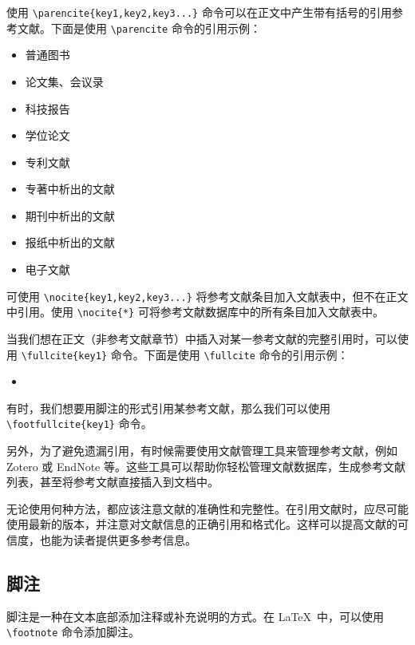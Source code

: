 使用 \verb|\parencite{key1,key2,key3...}| 命令可以在正文中产生带有括号的引用参考文献。下面是使用 \verb|\parencite| 命令的引用示例：

\begin{itemize}
    \item 普通图书\parencite{book1,book2}
    \item 论文集、会议录\parencite{conf1,conf2}
    \item 科技报告\parencite{techreport1,techreport2}
    \item 学位论文\parencite{thesis1,thesis2,thesis3}
    \item 专利文献\parencite{patent1,patent2}
    \item 专著中析出的文献\parencite{inbook1,inbook2}
    \item 期刊中析出的文献\parencite{qin2021,article1,article2}
    \item 报纸中析出的文献\parencite{newspaper1,newspaper2}
    \item 电子文献\parencite{online1,online2,online3}
\end{itemize}

可使用 \verb|\nocite{key1,key2,key3...}| 将参考文献条目加入文献表中，但不在正文中引用。使用 \verb|\nocite{*}| 可将参考文献数据库中的所有条目加入文献表中。

当我们想在正文（非参考文献章节）中插入对某一参考文献的完整引用时，可以使用 \verb|\fullcite{key1}| 命令。下面是使用 \verb|\fullcite| 命令的引用示例：

\begin{itemize}
    \item {}
\end{itemize}

有时，我们想要用脚注的形式引用某参考文献，那么我们可以使用 \verb|\footfullcite{key1}| 命令。

另外，为了避免遗漏引用，有时候需要使用文献管理工具来管理参考文献，例如 Zotero 或 EndNote 等。这些工具可以帮助你轻松管理文献数据库，生成参考文献列表，甚至将参考文献直接插入到文档中。

无论使用何种方法，都应该注意文献的准确性和完整性。在引用文献时，应尽可能使用最新的版本，并注意对文献信息的正确引用和格式化。这样可以提高文献的可信度，也能为读者提供更多参考信息。

\subsection{脚注}

脚注是一种在文本底部添加注释或补充说明的方式。在 \LaTeX\ 中，可以使用 \verb|\footnote| 命令添加脚注。

